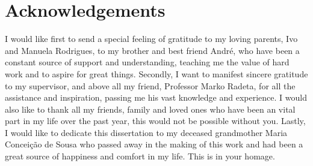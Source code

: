 \chapter*{Acknowledgements}

I would like first to send a special feeling of gratitude to my loving parents, Ivo and Manuela Rodrigues, to my brother and best friend André, who have been a constant source of support and understanding, teaching me the value of hard work and to aspire for great things.
Secondly, I want to manifest sincere gratitude to my supervisor, and above all my friend, Professor Marko Radeta, for all the assistance and inspiration, passing me his vast knowledge and experience.
I would also like to thank all my friends, family and loved ones who have been an vital part in my life over the past year, this would not be possible without you.
Lastly, I would like to dedicate this dissertation to my deceased grandmother Maria Conceição de Sousa who passed away in the making of this work and had been a great source of happiness and comfort in my life. This is in your homage.

